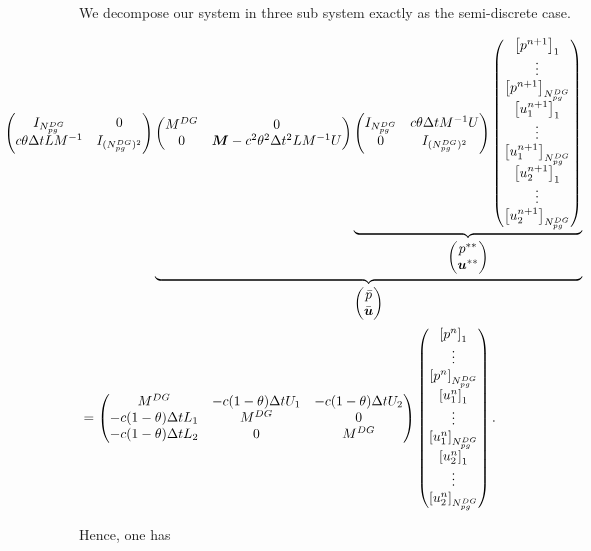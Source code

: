 \documentclass[a4paper, 11pt]{report}
\begin{document}
We decompose our system in three sub system exactly as the semi-discrete case.
\begin{small}
\begin{equation*}
\begin{split}
&\hspace*{-2cm}
\begin{pmatrix}
I_{N_{pg}^{DG}}& 0 \\
c\theta\Delta tLM^{-1} & I_{(N_{pg}^{DG})^2}
\end{pmatrix}
\underbrace{\begin{pmatrix}
M^{DG}& 0\\
0 & \boldsymbol{M}-c^2\theta^2\Delta t^2LM^{-1}U
\end{pmatrix}
\underbrace{
\begin{pmatrix}
I_{N_{pg}^{DG}}& c\theta\Delta t M^{-1}U\\
0 & I_{(N_{pg}^{DG})^2}
\end{pmatrix}\begin{pmatrix}\left[p^{n+1}\right]_1\\ \vdots \\ \left[p^{n+1}\right]_{N_{pg}^{DG}}\\ \left[u_1^{n+1}\right]_1\\ \vdots \\ \left[u_1^{n+1}\right]_{N_{pg}^{DG}}\\ \left[u_2^{n+1}\right]_1\\ \vdots  \\ \left[u_2^{n+1}\right]_{N_{pg}^{DG}}\end{pmatrix}}_{\begin{pmatrix}p^{**}\\\boldsymbol{u}^{**}\end{pmatrix}}}_{\begin{pmatrix}\bar{p}\\\bar{\boldsymbol{u}}\end{pmatrix}}\\
&=\begin{pmatrix}
M^{DG}& -c(1-\theta)\Delta t U_1 & -c(1-\theta)\Delta t U_2\\
-c(1-\theta)\Delta t L_1 & M^{DG}&0\\
-c(1-\theta)\Delta t L_2&0&M^{DG}
\end{pmatrix}\begin{pmatrix}\left[p^{n}\right]_1\\ \vdots \\ \left[p^{n}\right]_{N_{pg}^{DG}}\\ \left[u_1^{n}\right]_1\\ \vdots \\ \left[u_1^{n}\right]_{N_{pg}^{DG}}\\ \left[u_2^{n}\right]_1\\ \vdots  \\ \left[u_2^{n}\right]_{N_{pg}^{DG}}\end{pmatrix}.
\end{split}
\end{equation*}
\end{small}
Hence, one has
\end{document}
